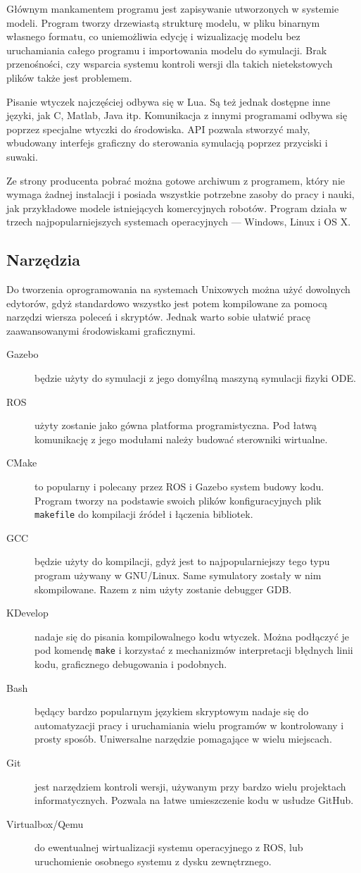 		Głównym mankamentem programu jest zapisywanie utworzonych w systemie modeli.
		Program tworzy drzewiastą strukturę modelu, w pliku binarnym własnego formatu, co uniemożliwia edycję i wizualizację modelu bez uruchamiania całego programu 
		i importowania modelu do symulacji.
		Brak przenośności, czy wsparcia systemu kontroli wersji dla takich nietekstowych plików także jest problemem.

		Pisanie wtyczek najczęściej odbywa się w Lua. Są też jednak dostępne inne języki, jak C, Matlab, Java itp.
		Komunikacja z innymi programami odbywa się poprzez specjalne wtyczki do środowiska.
		API pozwala stworzyć mały, wbudowany interfejs graficzny do sterowania symulacją poprzez przyciski i suwaki.

		Ze strony producenta pobrać można gotowe archiwum z programem, który nie wymaga żadnej instalacji i posiada wszystkie potrzebne zasoby do pracy i nauki, 
		jak przykładowe modele istniejących komercyjnych robotów.
		Program działa w trzech najpopularniejszych systemach operacyjnych --- Windows, Linux i OS X.

	\subsection{Narzędzia}
	Do tworzenia oprogramowania na systemach Unixowych można użyć dowolnych edytorów, gdyż standardowo wszystko jest potem kompilowane za pomocą narzędzi wiersza poleceń i skryptów.
	Jednak warto sobie ułatwić pracę zaawansowanymi środowiskami graficznymi.
	\begin{description}
	\item[Gazebo] będzie użyty do symulacji z jego domyślną maszyną symulacji fizyki ODE.
	\item[ROS] użyty zostanie jako gówna platforma programistyczna. Pod łatwą komunikację z jego modułami należy budować sterowniki wirtualne.
	\item[CMake] to popularny i polecany przez ROS i Gazebo system budowy kodu. Program tworzy na podstawie swoich plików konfiguracyjnych plik \texttt{makefile} do kompilacji źródeł i łączenia bibliotek.
	\item[GCC] będzie użyty do kompilacji, gdyż jest to najpopularniejszy tego typu program używany w GNU/Linux. Same symulatory zostały w nim skompilowane.
	Razem z nim użyty zostanie debugger GDB. 
	\item[KDevelop] nadaje się do pisania kompilowalnego kodu wtyczek. Można podłączyć je pod komendę \texttt{make} i korzystać z mechanizmów interpretacji błędnych linii kodu, graficznego debugowania i podobnych.
	\item[Bash] będący bardzo popularnym językiem skryptowym nadaje się do automatyzacji pracy i uruchamiania wielu programów w kontrolowany i prosty sposób.
	Uniwersalne narzędzie pomagające w wielu miejscach.
	\item[Git] jest narzędziem kontroli wersji, używanym przy bardzo wielu projektach informatycznych. Pozwala na łatwe umieszczenie kodu w usłudze GitHub.
	\item[Virtualbox/Qemu] do ewentualnej wirtualizacji systemu operacyjnego z ROS, lub uruchomienie osobnego systemu z dysku zewnętrznego.
	\end{description}

